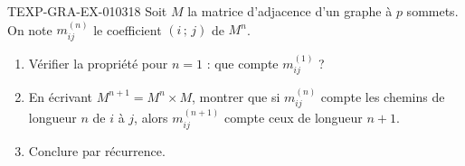 % 
% 
\begin{exercice}{TEXP-GRA-EX-010}{3}{18}
Soit $M$ la matrice d'adjacence d'un graphe à $p$ sommets. On note $m^{(n)}_{ij}$
le coefficient $(i\,;\,j)$ de $M^n$.
\begin{enumerate}
  \item Vérifier la propriété pour $n=1$ : que compte $m^{(1)}_{ij}$ ?
  \item En écrivant $M^{n+1}=M^n\times M$, montrer que si $m^{(n)}_{ij}$ compte
        les chemins de longueur $n$ de $i$ à $j$, alors $m^{(n+1)}_{ij}$ compte
        ceux de longueur $n+1$.
  \item Conclure par récurrence.
\end{enumerate}
\end{exercice}
